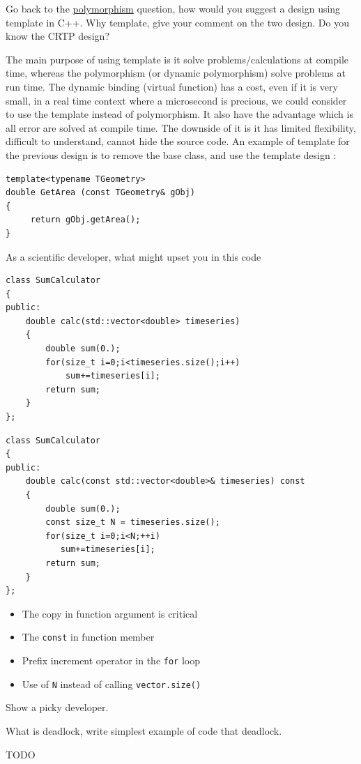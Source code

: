 \documentclass[answers]{exam}
\begin{document}
\begin{questions}
\question Go back to the \hyperref[cpp:dynamic_polymorphism]{polymorphism} question, how would you suggest a design using template in C++. Why template, give your comment on the two design. Do you know the CRTP design?
\begin{solution}[.2in]
The main purpose of using template is it solve problems/calculations at compile time, whereas the polymorphism (or dynamic polymorphism) solve problems at run time. The dynamic binding (virtual function) has a cost, even if it is very small, in a real time context where a microsecond is precious, we could consider to use the template instead of polymorphism. It also have the advantage which is all error are solved at compile time. The downside of it is it has limited flexibility, difficult to understand, cannot hide the source code. An example of template for the previous design is to remove the base class, and use the template design :
\begin{lstlisting}
template<typename TGeometry>
double GetArea (const TGeometry& gObj)
{
	 return gObj.getArea();
}
\end{lstlisting}
\end{solution}

\question As a scientific developer, what might upset you in this code 
\begin{lstlisting}
class SumCalculator
{
public:
	double calc(std::vector<double> timeseries)
	{
		double sum(0.);
		for(size_t i=0;i<timeseries.size();i++)
		    sum+=timeseries[i];
		return sum;
	}
};
\end{lstlisting}
\begin{solution}[.2in] 
\begin{lstlisting}
class SumCalculator
{
public:
	double calc(const std::vector<double>& timeseries) const
	{
		double sum(0.);
		const size_t N = timeseries.size();
		for(size_t i=0;i<N;++i)
		   sum+=timeseries[i];
		return sum;
	}
};
\end{lstlisting}
\begin{itemize}
	\item The copy in function argument is critical
	\item The \lstinline{const} in function member
	\item Prefix increment operator in the \lstinline{for} loop
	\item Use of \lstinline{N} instead of calling \lstinline{vector.size()}
\end{itemize}
Show a picky developer.
\end{solution}

\question What is deadlock, write simplest example of code that deadlock.
\begin{solution}[.2in]
TODO
\end{solution}

\end{questions}
\fi
%
%
\end{document}
